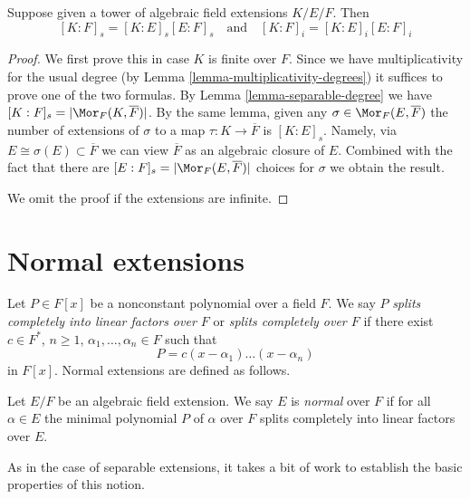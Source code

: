 \begin{lemma}[Multiplicativity]
\label{lemma-multiplicativity-all-degrees}
Suppose given a tower of algebraic field extensions $K/E/F$. Then
$$
[K : F]_s = [K : E]_s [E : F]_s
\quad\text{and}\quad
[K : F]_i = [K : E]_i [E : F]_i
$$
\end{lemma}

\begin{proof}
We first prove this in case $K$ is finite over $F$. Since we have
multiplicativity for the usual degree (by
Lemma \ref{lemma-multiplicativity-degrees}) it suffices to prove
one of the two formulas. By Lemma \ref{lemma-separable-degree} we have
$[K : F]_s = |\Mor_F(K, \overline{F})|$. By the same lemma,
given any $\sigma \in \Mor_F(E, \overline{F})$ the number of extensions
of $\sigma$ to a map $\tau : K \to \overline{F}$ is $[K : E]_s$.
Namely, via $E \cong \sigma(E) \subset \overline{F}$ we can view
$\overline{F}$ as an algebraic closure of $E$. Combined with the
fact that there are $[E : F]_s = |\Mor_F(E, \overline{F})|$ choices
for $\sigma$ we obtain the result.

\medskip\noindent
We omit the proof if the extensions are infinite.
\end{proof}









\section{Normal extensions}
\label{section-normal}

\noindent
Let $P \in F[x]$ be a nonconstant polynomial over a field $F$. We say $P$
{\it splits completely into linear factors over $F$} or
{\it splits completely over $F$} if there exist
$c \in F^*$, $n \geq 1$, $\alpha_1, \ldots, \alpha_n \in F$ such that
$$
P = c(x - \alpha_1) \ldots (x - \alpha_n)
$$
in $F[x]$. Normal extensions are defined as follows.

\begin{definition}
\label{definition-normal}
Let $E/F$ be an algebraic field extension. We say $E$ is {\it normal}
over $F$ if for all $\alpha \in E$ the minimal polynomial $P$
of $\alpha$ over $F$ splits completely into linear factors over $E$.
\end{definition}

\noindent
As in the case of separable extensions, it takes a bit of work to establish
the basic properties of this notion.

